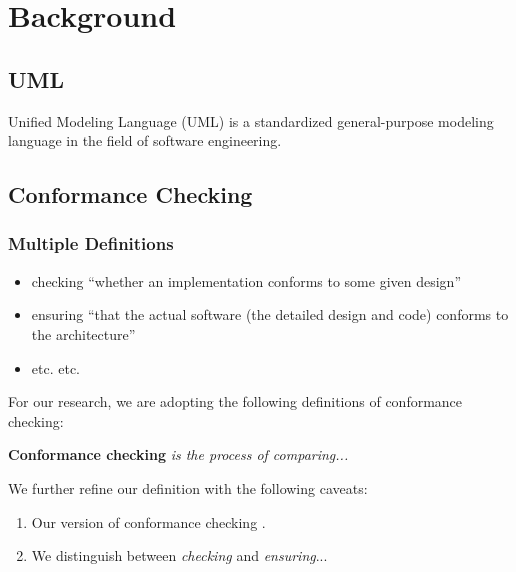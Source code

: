 \chapter{Background}\label{ch:Background}

\section{UML}

Unified Modeling Language (UML) is a standardized general-purpose modeling language in the field of software engineering.

\section{Conformance Checking}\label{sec:CCBackground}

\subsection{Multiple Definitions}

    \begin{sloppypar}
    \begin{itemize}
        \item checking ``whether an implementation conforms to some given
        design''~\cite{Wuy01}
        \item ensuring ``that the actual software (the detailed design and code) conforms
        to the architecture''~\cite{Flo02}
        \item etc. etc.
    \end{itemize}
    \end{sloppypar}


    For our research, we  are adopting  the following definitions of
    conformance checking:

    \noindent \textbf{Conformance checking} \emph{is the process of comparing...}

    We further refine our definition with the following caveats:

    \begin{enumerate}

        \item Our version of conformance checking .

        \item We distinguish between \emph{checking} and \emph{ensuring}...

    \end{enumerate}


